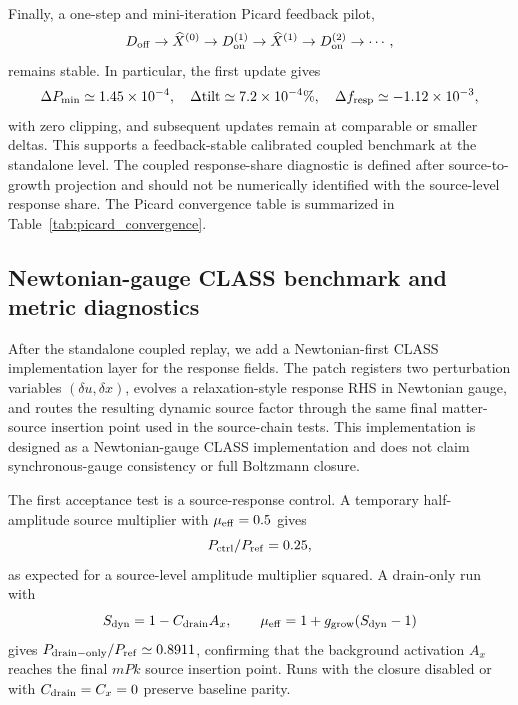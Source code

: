 ﻿\documentclass[11pt,prd,preprint,nofootinbib,amsmath,amssymb]{revtex4-2}
\begin{document}
Finally, a one-step and mini-iteration Picard feedback pilot,
\begin{equation}
D_{\rm off}\rightarrow \widehat X^{(0)}\rightarrow D_{\rm on}^{(1)}
\rightarrow \widehat X^{(1)}\rightarrow D_{\rm on}^{(2)}\rightarrow \cdots ,
\end{equation}
remains stable. In particular, the first update gives
\begin{equation}
\Delta P_{\min}\simeq1.45\times10^{-4},\quad
\Delta \mathrm{tilt}\simeq7.2\times10^{-4}\%,\quad
\Delta f_{\rm resp}\simeq-1.12\times10^{-3},
\end{equation}
with zero clipping, and subsequent updates remain at comparable or smaller deltas. This supports a feedback-stable calibrated coupled benchmark at the standalone level.
The coupled response-share diagnostic is defined after source-to-growth
projection and should not be numerically identified with the source-level
response share.
The Picard convergence table is summarized in
Table~\ref{tab:picard_convergence}.


\subsection{Newtonian-gauge CLASS benchmark and metric diagnostics}

After the standalone coupled replay, we add a Newtonian-first CLASS
implementation layer for the response fields. The patch registers two perturbation
variables $(\delta u,\delta x)$, evolves a relaxation-style response RHS in
Newtonian gauge, and routes the resulting dynamic source factor through the
same final matter-source insertion point used in the source-chain tests. This
implementation is designed as a Newtonian-gauge CLASS implementation and does not claim
synchronous-gauge consistency or full Boltzmann closure.

The first acceptance test is a source-response control. A temporary
half-amplitude source multiplier with
$\mu_{\rm eff}=0.5$ gives
\[
P_{\rm ctrl}/P_{\rm ref}=0.25,
\]
as expected for a source-level amplitude multiplier squared. A drain-only run
with
\[
S_{\rm dyn}=1-C_{\rm drain}A_x,\qquad
\mu_{\rm eff}=1+g_{\rm grow}(S_{\rm dyn}-1)
\]
gives $P_{\rm drain-only}/P_{\rm ref}\simeq0.8911$, confirming that the background
activation $A_x$ reaches the final $mPk$ source insertion point. Runs with the closure
disabled or with $C_{\rm drain}=C_x=0$ preserve baseline parity.
\end{document}
